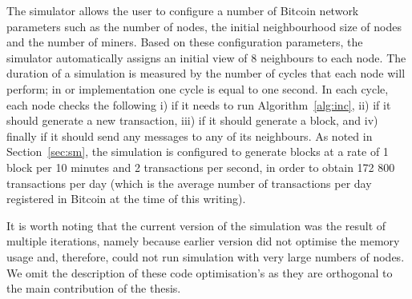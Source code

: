 The simulator allows the user to configure a number of Bitcoin network parameters such as the number of nodes, the initial neighbourhood size of nodes and the number of miners. Based on these configuration parameters, the simulator automatically assigns an initial view of 8 neighbours to each node. The duration of a simulation is measured by the number of cycles that each node will perform; in or implementation one cycle is equal to one second. In each cycle, each node checks the following i) if it needs to run Algorithm~\ref{alg:inc}, ii) if it should generate a new transaction, iii) if it should generate a block, and iv) finally if it should send any messages to any of its neighbours. As noted in Section~\ref{sec:sm}, the simulation is configured to generate blocks at a rate of 1 block per 10 minutes and 2 transactions per second, in order to obtain 172 800 transactions per day (which is the average number of transactions per day registered in Bitcoin at the time of this writing). 

It is worth noting that the current version of the simulation was the result of multiple iterations, namely because earlier version did not optimise the memory usage and, therefore, could not run simulation with very large numbers of nodes. We omit the description of these code optimisation's as they are orthogonal to the main contribution of the thesis.



